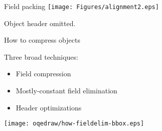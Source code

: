 \documentclass[%
pdf,
colorBG,
slideColor,
nototal,
oqe
]{prosper}
\begin{document}


\begin{slide}{Field packing}
\centering
\vspace{0.75cm}
\texttt{[image: Figures/alignment2.eps]}

\small Object header omitted.
\end{slide}

\begin{slide}{How to compress objects} %

Three broad techniques:

\parbox[b]{2.5in}{%
\begin{itemize}%
\lightgray\renewcommand{\green}{\lightgray}%
\item Field compression
\fieldelim\renewcommand{\green}{\fieldelim}%
\item Mostly-constant field elimination
\lightgray\renewcommand{\green}{\lightgray}%
\item Header optimizations
\renewcommand{\green}{\yellow} %
\end{itemize}
}%
\parbox[b]{1.75in}{%
\hspace*{0.106in}\texttt{[image: oqedraw/how-fieldelim-bbox.eps]}%
}%
\end{slide}
\end{document}
